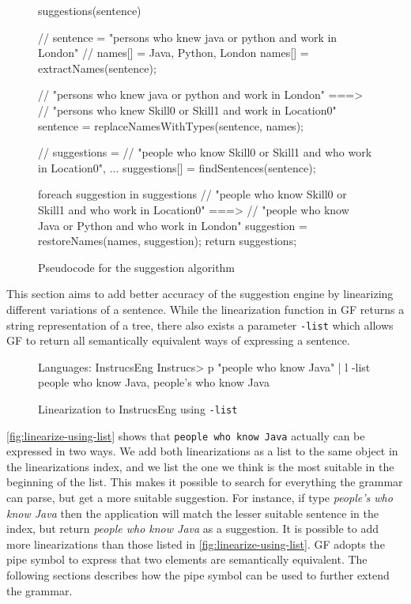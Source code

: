 \begin{figure}[H]
\begin{java-code}
suggestions(sentence) {
    // sentence = "persons who knew java or python and work in London"
    // names[] = {Java, Python, London}
    names[] = extractNames(sentence);
    
    // "persons who knew java or python and work in London" ===> 
    // "persons who knew Skill0 or Skill1 and work in Location0"
    sentence = replaceNamesWithTypes(sentence, names);
    
    // suggestions =
    //   { "people who know Skill0 or Skill1 and who work in Location0", ... }
    suggestions[] = findSentences(sentence);
    
    foreach suggestion in suggestions {
        // "people who know Skill0 or Skill1 and who work in Location0" ===> 
        // "people who know Java or Python and who work in London"
        suggestion = restoreNames(names, suggestion);
    } 
    return suggestions; 
}
\end{java-code}
\caption{Pseudocode for the suggestion algorithm\label{fig:psuedocode-suggestions}}
\end{figure}

This section aims to add better accuracy of the suggestion engine by linearizing different variations of a sentence. While the linearization function in GF returns a string representation of a tree, there also exists a parameter \texttt{-list} which allows GF to return all semantically equivalent ways of expressing a sentence.

\begin{figure}[H]
\begin{terminal}
Languages: InstrucsEng
Instrucs> p "people who know Java" | l -list
people who know Java, people's who know Java
\end{terminal}
\caption{Linearization to InstrucsEng using \texttt{-list}\label{fig:linearize-using-list}}
\end{figure}

\autoref{fig:linearize-using-list} shows that \texttt{people who know Java} actually can be expressed in two ways. We add both linearizations as a list to the same object in the linearizations index, and we list the one we think is the most suitable in the beginning of the list. This makes it possible to search for everything the grammar can parse, but get a more suitable suggestion. For instance, if type \emph{people's who know Java} then the application will match the lesser suitable sentence in the index, but return \emph{people who know Java} as a suggestion.
\newline
\newline
It is possible to add more linearizations than those listed in \autoref{fig:linearize-using-list}. GF adopts the pipe symbol to express that two elements are semantically equivalent. The following sections describes how the pipe symbol can be used to further extend the grammar.

